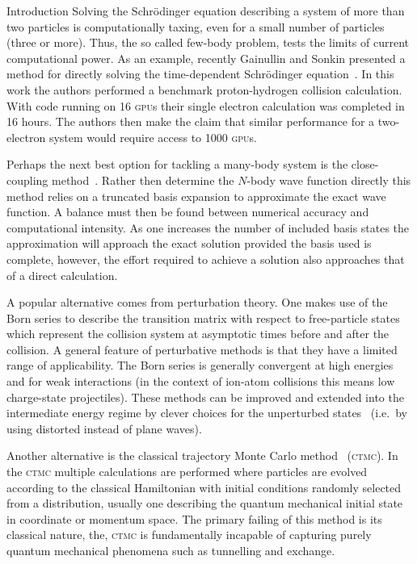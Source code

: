 \documentclass[letterpaper, 11 pt]{report}
\begin{document}
\begin{chapter}{Introduction \label{chap:intro}}
   Solving the Schr\"{o}dinger equation describing a system of more than two particles is
   computationally taxing, even for a small number of particles (three or more). Thus, the so called
   few-body problem, tests the limits of current computational power. As an example, recently Gainullin
   and Sonkin presented a method for directly solving the time-dependent Schr\"{o}dinger
   equation~\cite{gpuCalc}. In this work the authors performed a benchmark proton-hydrogen collision
   calculation. With code running on 16 \textsc{gpu}s their single electron calculation was completed in
   16 hours. The authors then make the claim that similar performance for a two-electron system would
   require access to 1000 \textsc{gpu}s.

   Perhaps the next best option for tackling a many-body system is the close-coupling
   method~\cite{ccRev}. Rather then determine the $N$-body wave function directly this method relies on
   a truncated basis expansion to approximate the exact wave function. A balance must then be found
   between numerical accuracy and computational intensity. As one increases the number of included basis
   states the approximation will approach the exact solution provided the basis used is complete,
   however, the effort required to achieve a solution also approaches that of a direct calculation.

   A popular alternative comes from perturbation theory. One makes use of the Born series to describe
   the transition matrix with respect to free-particle states which represent the collision system at
   asymptotic times before and after the collision. A general feature of perturbative methods is that
   they have a limited range of applicability. The Born series is generally convergent at high energies
   and for weak interactions (in the context of ion-atom collisions this means low charge-state
   projectiles). These methods can be improved and extended into the intermediate energy regime by
   clever choices for the unperturbed states~\cite{perRev1, perRev2} (i.e.\ by using distorted instead
   of plane waves).

   Another alternative is the classical trajectory Monte Carlo method~\cite{ctmcRev} (\textsc{ctmc}). In
   the \textsc{ctmc} multiple calculations are performed where particles are evolved according to the
   classical Hamiltonian with initial conditions randomly selected from a distribution, usually one
   describing the quantum mechanical initial state in coordinate or momentum space. The primary failing
   of this method is its classical nature, the, \textsc{ctmc} is fundamentally incapable of capturing
   purely quantum mechanical phenomena such as tunnelling and exchange.


\end{chapter}
\end{document}
